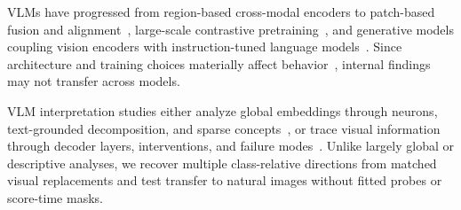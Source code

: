 VLMs have progressed from region-based cross-modal encoders to patch-based fusion and
alignment~\cite{LuEtAl2019ViLBERT,TanBansal2019LXMERT,ChenEtAl2020UNITER,
KimEtAl2021ViLT,LiEtAl2021ALBEF}, large-scale contrastive
pretraining~\cite{RadfordEtAl2021,JiaEtAl2021}, and generative models coupling vision
encoders with instruction-tuned language models~\cite{AlayracEtAl2022,
LiEtAl2023BLIP2,LiuEtAl2023LLaVA,BaiEtAl2023QwenVL,WangEtAl2024Qwen2VL,
BaiEtAl2025Qwen25VL}.  Since architecture and training choices materially affect
behavior~\cite{KaramchetiEtAl2024}, internal findings may not transfer across models.

VLM interpretation studies either analyze global embeddings through neurons,
text-grounded decomposition, and sparse concepts~\cite{GohEtAl2021,OikarinenWeng2023,
GandelsmanEtAl2024,BhallaEtAl2024,ZaigrajewEtAl2025,PapadimitriouEtAl2025,
PachEtAl2025}, or trace visual information through decoder layers, interventions, and
failure modes~\cite{NeoEtAl2025,KrojerEtAl2026,LiEtAl2025CausalTracing,TongEtAl2024,
ChenEtAl2024FastV,JiangEtAl2024,SongEtAl2026}.  Unlike largely global or descriptive
analyses, we recover multiple class-relative directions from matched visual
replacements and test transfer to natural images without fitted probes or score-time
masks.